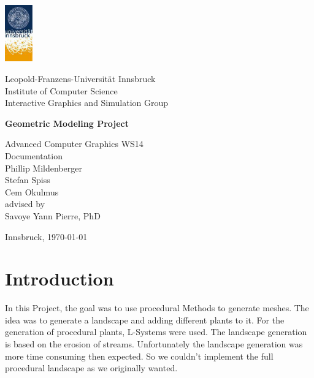 \documentclass[11pt,a4paper]{article}
\begin{document}

\begin{titlepage} %

\begin{center}
\includegraphics[width=1.2cm]{images/uibk}

\begin{large}
Leopold-Franzens-Universität Innsbruck\\[5mm]
Institute of Computer Science\\
Interactive Graphics and Simulation Group\\[25mm]
\end{large}

{\LARGE \bf Geometric Modeling Project}

Advanced Computer Graphics WS14\\ 
Documentation\\[15mm]

Phillip Mildenberger\\
Stefan Spiss\\
Cem Okulmus\\[35mm]

advised by\\
Savoye Yann Pierre, PhD\\[10mm]

\vfill


Innsbruck, \today
\end{center}

\end{titlepage}



\section{Introduction}
In this Project, the goal was to use procedural Methods to generate meshes. 
The idea was to generate a landscape and adding different plants to it.
For the generation of procedural plants, L-Systems were used. The landscape generation is based on the erosion of streams. Unfortunately the landscape generation was more time consuming then expected. So we couldn't implement the full procedural landscape as we originally wanted.
\end{document}

